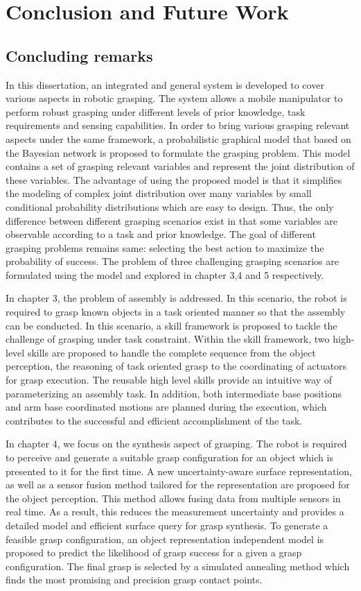 \chapter{Conclusion and Future Work}

\section{Concluding remarks}
In this dissertation, an integrated and general system is developed to cover various aspects in robotic grasping. The system allows a mobile manipulator to perform robust grasping under different levels of prior knowledge, task requirements and sensing capabilities. In order to bring various grasping relevant aspects under the same framework, a probabilistic graphical model that based on the Bayesian network is proposed to formulate the grasping problem. This model contains a set of grasping relevant variables and represent the joint distribution of these variables. The advantage of using the proposed model is that it simplifies the modeling of complex joint distribution over many variables by small conditional probability distributions which are easy to  design. Thus, the only difference between different grasping scenarios exist in that some variables are observable according to a task and prior knowledge. The goal of different grasping problems remains same: selecting the best action to maximize the probability of success. The problem of three challenging grasping scenarios are formulated using the model and explored in chapter 3,4 and 5 respectively. 

In chapter 3, the problem of assembly is addressed. In this scenario, the robot is required to grasp known objects in a task oriented manner so that the assembly can be conducted. In this scenario, a skill framework is proposed to tackle the challenge of grasping under task constraint. Within the skill framework, two high- level skills are proposed to handle the complete sequence from the object perception, the reasoning of task oriented grasp to the coordinating of actuators for grasp execution. The reusable high level skills provide an intuitive way of parameterizing an assembly task. In addition, both intermediate base positions and arm base coordinated motions are planned during the execution, which contributes to the successful and efficient accomplishment of the task. 

In chapter 4, we focus on the synthesis aspect of grasping. The robot is required to perceive and generate a suitable grasp configuration for an object which is presented to it for the first time. A new uncertainty-aware surface representation, as well as a sensor fusion method tailored for the representation are proposed for the object perception. This method allows fusing data from multiple sensors in real time. As a result, this reduces the measurement uncertainty and provides a detailed model and efficient surface query for grasp synthesis. To generate a feasible grasp configuration, an object representation independent model is proposed to predict the likelihood of grasp success for a given a grasp configuration. The final grasp is selected by a simulated annealing method which finds the most promising and precision grasp contact points. 

